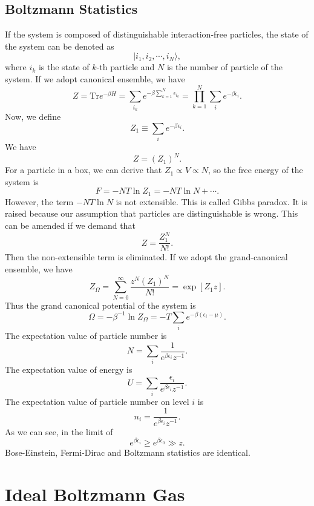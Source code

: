 \subsection{Boltzmann Statistics}
If the system is composed of distinguishable interaction-free particles, the state of the system can be denoted as
\[|i_1,i_2,\cdots,i_N\rangle,\] 
where $i_k$ is the state of $k$-th particle and $N$ is the number of particle of the system. 
If we adopt canonical ensemble, we have
\[Z =　\mathrm{Tr} e^{-\beta H} = \sum_{i_k} e^{-\beta\sum_{k=1}^N \epsilon_{i_k}} = \prod_{k=1}^N \sum_i e^{-\beta \epsilon_i}.\]
Now, we define
\[Z_1 \equiv \sum_i e^{-\beta \epsilon_i}.\] 
We have
\[Z = (Z_1)^N.\]
For a particle in a box, we can derive that $Z_1 \propto V \propto N$, so the free energy of the system is
\[F = -NT\ln Z_1 = -NT\ln N + \cdots.\]
However, the term $-NT\ln N$ is not extensible. This is called Gibbs paradox. It is raised because our assumption that particles are distinguishable is wrong. This can be amended if we demand that
\[Z = \frac{Z_1^N}{N!}.\]
Then the non-extensible term is eliminated.
If we adopt the grand-canonical ensemble, we have
\[Z_{\Omega} = \sum_{N=0}^{\infty} \frac{z^N (Z_1)^N}{N!} = \exp[Z_1 z].\]
Thus the grand canonical potential of the system is
\[\Omega = -\beta^{-1}\ln Z_{\Omega} = -T \sum_i e^{-\beta(\epsilon_i-\mu)}.\]
The expectation value of particle number is
\[N = \sum_i \frac{1}{e^{\beta \epsilon_i}z^{-1}}.\]
The expectation value of energy is
\[U = \sum_i \frac{\epsilon_i}{e^{\beta \epsilon_i}z^{-1}}.\]
The expectation value of particle number on level $i$ is
\[n_i =  \frac{1}{e^{\beta \epsilon_i}z^{-1}}.\]
As we can see, in the limit of
\[e^{\beta\epsilon_i} \geq e^{\beta\epsilon_0}  \gg z.\] Bose-Einstein, Fermi-Dirac and Boltzmann statistics are identical.  

\section{Ideal Boltzmann Gas}
